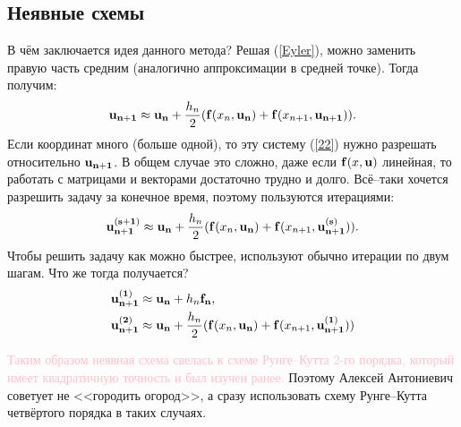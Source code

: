 \documentclass[a4,14pt,russian]{article}
\begin{document}
\subsection{Неявные схемы}
    В чём заключается идея данного метода? Решая (\ref{Eyler}), можно заменить правую часть средним (аналогично аппроксимации в средней точке). Тогда получим:
    \begin{equation}\label{22}
        {\bf u_{n+1}} \approx {\bf u_{n}} + \frac{h_n}{2} ({\bf f}(x_n, {\bf u_n}) + {\bf f}(x_{n+1}, {\bf u_{n+1}})).
    \end{equation}
    Если координат много (больше одной), то эту систему (\ref{22}) нужно  разрешать относительно ${\bf u_{n+1}}$. В общем случае это сложно, даже если ${\bf f}(x, {\bf u})$ линейная, то работать с матрицами и векторами достаточно трудно и долго. Всё--таки хочется разрешить задачу за конечное время, поэтому пользуются итерациями:
    \begin{equation}\label{interp}
     {\bf u_{n+1}^{(s+1)}} \approx {\bf u_{n}} + \frac{h_n}{2} ({\bf f}(x_n, {\bf u_n}) + {\bf f}(x_{n+1}, {\bf u_{n+1}^{(s)}})).
    \end{equation}
    Чтобы решить задачу как можно быстрее, используют обычно итерации по двум шагам. Что же тогда получается?
    \begin{equation}
    \begin{split}
     {\bf u_{n+1}^{(1)}} &\approx {\bf u_{n}} + h_n {\bf f_{n}},\\
     {\bf u_{n+1}^{(2)}} &\approx {\bf u_{n}} + \frac{h_n}{2} ({\bf f}(x_n, {\bf u_n}) + {\bf f}(x_{n+1}, {\bf u_{n+1}^{(1)}}))
    \end{split}
    \end{equation}\par
    \textcolor{pink}{Таким образом неявная схема свелась к схеме Рунге--Кутта 2-го порядка, который имеет квадратичную точность и был изучен ранее.} Поэтому Алексей Антониевич советует не <<городить огород>>, а сразу использовать схему Рунге--Кутта четвёртого порядка в таких случаях.
\end{document}
